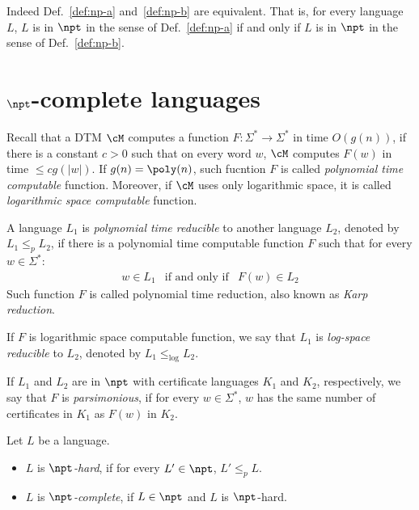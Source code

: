 \documentclass[11pt, a4paper]{article}
\begin{document}
Indeed Def.~\ref{def:np-a} and~\ref{def:np-b} are equivalent.
That is,
for every language $L$,
$L$ is in $\npt$ in the sense of Def.~\ref{def:np-a}
if and only if $L$ is in $\npt$ in the sense of Def.~\ref{def:np-b}.



\section{$\npt$-complete languages}

Recall that a DTM $\cM$ computes a function $F:\Sigma^*\to\Sigma^*$ in time $O(g(n))$, if
there is a constant $c> 0$ such that
on every word $w$, $\cM$ computes $F(w)$ in time $\leq cg(|w|)$.
If $g(n)=\poly(n)$,
such fucntion $F$ is called {\em polynomial time computable} function.
Moreover, if $\cM$ uses only logarithmic space,
it is called {\em logarithmic space computable} function.


\begin{definition}
\label{def:reduction}
A language $L_1$ is {\em polynomial time  reducible} to another language $L_2$,
denoted by $L_1\leq_p L_2$,
if there is a polynomial time computable function $F$ such that
for every $w\in \Sigma^{*}$:
\begin{eqnarray*}
w\in L_1 & \text{if and only if} & F(w) \in L_2
\end{eqnarray*}
Such function $F$ is called polynomial time reduction, also known as {\em Karp reduction}.

If $F$ is logarithmic space computable function,
we say that $L_1$ is {\em log-space reducible} to $L_2$,
denoted by $L_1\leq_{\log} L_2$.

If $L_1$ and $L_2$ are in $\npt$ with certificate languages $K_1$ and $K_2$, respectively,
we say that $F$ is {\em parsimonious}, if for every $w\in \Sigma^{\ast}$,
$w$ has the same number of certificates in $K_1$ as $F(w)$ in $K_2$.
\end{definition}




\begin{definition}
\label{def:np-complete}
Let $L$ be a language.
\begin{itemize}\itemsep=0pt
\item 
$L$ is {\em $\npt$-hard}, if
for every $L' \in \npt$, $L' \leq_p L$.
\item
$L$ is {\em $\npt$-complete},
if $L \in \npt$ and $L$ is $\npt$-hard.
\end{itemize}
\end{definition}
\end{document}
